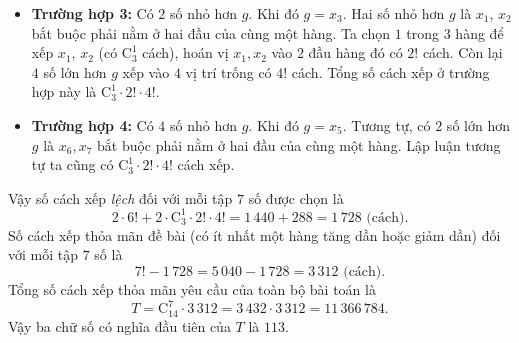 \begin{ex}
{\begin{itemize}
			\item \textbf{Trường hợp 3:} Có $2$ số nhỏ hơn $g$. Khi đó $g = x_3$. Hai số nhỏ hơn $g$ là $x_1$, $x_2$ bắt buộc phải nằm ở hai đầu của cùng một hàng.
			Ta chọn $1$ trong $3$ hàng để xếp $x_1$, $x_2$ (có $\mathrm{C}_3^1$ cách), hoán vị $x_1, x_2$ vào $2$ đầu hàng đó có $2!$ cách. Còn lại $4$ số lớn hơn $g$ xếp vào $4$ vị trí trống có $4!$ cách.
			Tổng số cách xếp ở trường hợp này là $\mathrm{C}_3^1 \cdot 2! \cdot 4!$.
			\item \textbf{Trường hợp 4:} Có $4$ số nhỏ hơn $g$. Khi đó $g = x_5$. Tương tự, có $2$ số lớn hơn $g$ là $x_6, x_7$ bắt buộc phải nằm ở hai đầu của cùng một hàng. Lập luận tương tự ta cũng có $\mathrm{C}_3^1 \cdot 2! \cdot 4!$ cách xếp.
		\end{itemize}
		Vậy số cách xếp \textit{lệch} đối với mỗi tập $7$ số được chọn là
		\[ 2 \cdot 6! + 2 \cdot \mathrm{C}_3^1 \cdot 2! \cdot 4! = 1\,440 + 288 = 1\,728 \text{ (cách)}. \]
		Số cách xếp thỏa mãn đề bài (có ít nhất một hàng tăng dần hoặc giảm dần) đối với mỗi tập $7$ số là
		\[ 7! - 1\,728 = 5\,040 - 1\,728 = 3\,312 \text{ (cách)}. \]
		Tổng số cách xếp thỏa mãn yêu cầu của toàn bộ bài toán là
		\[ T = \mathrm{C}_{14}^7 \cdot 3\,312 = 3\,432 \cdot 3\,312 = 11\,366\,784. \]
		Vậy ba chữ số có nghĩa đầu tiên của $T$ là $113$.
	}
\end{ex}
\newpage
{}
\label{B\thedeso}